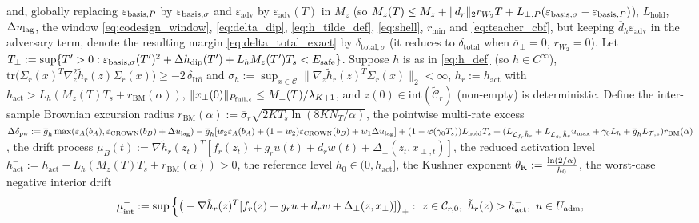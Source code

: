 \begin{corollary}
and, globally replacing \(\varepsilon_{\mathrm{basis},P}\) by \(\varepsilon_{\mathrm{basis},\sigma}\) and \(\varepsilon_{\mathrm{adv}}\) by \(\varepsilon_{\mathrm{adv}}(T)\) in \(M_z\) (so \(M_z(T) \le M_z + \|d_r\|_2r_{W_2}T + L_{\perp,P}(\varepsilon_{\mathrm{basis},\sigma} - \varepsilon_{\mathrm{basis},P})\)), \(L_{\mathrm{hold}}\), \(\Delta u_{\mathrm{lag}}\), the window \eqref{eq:codesign_window}, \eqref{eq:delta_dip}, \eqref{eq:h_tilde_def}, \eqref{eq:shell}, \(r_{\min}\) and \eqref{eq:teacher_cbf}, but keeping \(\overline{d}_h\varepsilon_{\mathrm{adv}}\) in the adversary term, denote the resulting margin \eqref{eq:delta_total_exact} by \(\delta_{\mathrm{total},\sigma}\) (it reduces to \(\delta_{\mathrm{total}}\) when \(\overline{\sigma}_\perp = 0\), \(r_{W_2} = 0\)). Let \(T_\perp := \sup\{T' > 0 : \varepsilon_{\mathrm{basis},\sigma}(T')^2 + \Delta h_{\mathrm{dip}}(T') + L_hM_z(T')T_s < E_{\mathrm{safe}}\}\). Suppose \(h\) is as in \eqref{eq:h_def} (so \(h \in C^\infty\)), \(\mathrm{tr}\big(\Sigma_r(x)^T \nabla_z^2 \tilde{h}_r(z) \Sigma_r(x)\big) \ge -2\,\delta_{\mathrm{It\hat{o}}}\) and \(\sigma_h := \sup_{x \in \mathcal{C}} \|\nabla_z\tilde{h}_r(z)^T\Sigma_r(x)\|_2 < \infty\), \(\overline{h}_r := h_{\mathrm{act}}\) with \(h_{\mathrm{act}} > L_h(M_z(T) T_s + r_{\mathrm{BM}}(\alpha))\), \(\|x_\perp(0)\|_{P_{\mathrm{full},\epsilon}} \le M_\perp(T)/\lambda_{K+1}\), and \(z(0) \in \mathrm{int}(\tilde{\mathcal{C}}_r)\) (non-empty) is deterministic. Define the inter-sample Brownian excursion radius \(r_{\mathrm{BM}}(\alpha) := \overline{\sigma}_r \sqrt{2 K T_s \ln(8 K N_T / \alpha)}\), the pointwise multi-rate excess \(\Delta\delta_{\mathrm{pw}} := \overline{g}_h\max(\varepsilon_A(b_A), \varepsilon_{\mathrm{CROWN}}(b_B) + \Delta u_{\mathrm{lag}}) - \overline{g}_h[w_2\varepsilon_A(b_A) + (1-w_2)\varepsilon_{\mathrm{CROWN}}(b_B) + w_1\Delta u_{\mathrm{lag}}] + (1 - \varphi(\gamma_0 T_s))L_{\mathrm{hold}}T_s + (L_{\mathcal{L}_{f_r}\tilde{h}_r} + L_{\mathcal{L}_{g_r}\tilde{h}_r}u_{\max} + \gamma_0 L_h + \overline{g}_h L_{\mathcal{T},z})r_{\mathrm{BM}}(\alpha)\), the drift process \(\mu_B(t) := \nabla\tilde h_r(z_t)^T[f_r(z_t) + g_ru(t) + d_rw(t) + \Delta_\perp(z_t, x_{\perp,t})]\), the reduced activation level \(h_{\mathrm{act}}^- := h_{\mathrm{act}} - L_h(M_z(T)T_s + r_{\mathrm{BM}}(\alpha)) > 0\), the reference level \(h_0 \in (0, h_{\mathrm{act}}]\), the Kushner exponent \(\theta_{\mathrm{K}} := \frac{\ln(2/\alpha)}{h_0}\), the worst-case negative interior drift
\[
\begin{aligned}
\underline{\mu}^-_{\mathrm{int}} := \sup\Big\{&\big(-\nabla\tilde h_r(z)^T[f_r(z) + g_ru + d_rw + \Delta_\perp(z,x_\perp)]\big)_+ :\ z \in \Crz,\ \tilde h_r(z) > h_{\mathrm{act}}^-,\ u \in U_{\mathrm{adm}},\\

\end{aligned}\]
\end{corollary}
